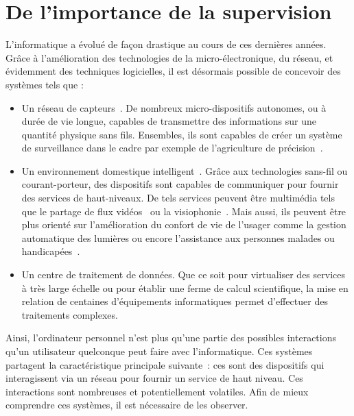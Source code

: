 \section{De l'importance de la supervision}\label{sec:intro:contexte}

L'informatique a évolué de façon drastique au cours de ces dernières années. Grâce à l'amélioration des technologies de la micro-électronique, du réseau, et évidemment des techniques logicielles, il est désormais possible de concevoir des systèmes tels que :
\begin{itemize}
 \item Un réseau de capteurs~\cite{Akyildiz:wsn, Szewczyk:monitoring}. De nombreux micro-dispositifs autonomes, ou à durée de vie longue, capables de transmettre des informations sur une quantité physique sans fils. Ensembles, ils sont capables de créer un système de surveillance dans le cadre par exemple de l'agriculture de précision~\cite{Jurdak:sumac}.
 \item Un environnement domestique intelligent~\cite{Harper:smarthome, Chan:smarthome, Coyle:assisted}. Grâce aux technologies sans-fil ou courant-porteur, des dispositifs sont capables de communiquer pour fournir des services de haut-niveaux. De tels services peuvent être multimédia tels que le partage de flux vidéos~\cite{Kang:upnpav} ou la visiophonie~\cite{Vilei:videophone}. Mais aussi, ils peuvent être plus orienté sur l'amélioration du confort de vie de l'usager comme la gestion automatique des lumières ou encore l'assistance aux personnes malades ou handicapées~\cite{Korhonen:health}.
 \item Un centre de traitement de données. Que ce soit pour virtualiser des services à très large échelle ou pour établir une ferme de calcul scientifique, la mise en relation de centaines d'équipements informatiques permet d'effectuer des traitements complexes.
\end{itemize}

Ainsi, l'ordinateur personnel n'est plus qu'une partie des possibles interactions qu'un utilisateur quelconque peut faire avec l'informatique. Ces systèmes partagent la caractéristique principale suivante~: ces sont des dispositifs qui interagissent via un réseau pour fournir un service de haut niveau. Ces interactions sont nombreuses et potentiellement volatiles. Afin de mieux comprendre ces systèmes, il est nécessaire de les observer.

